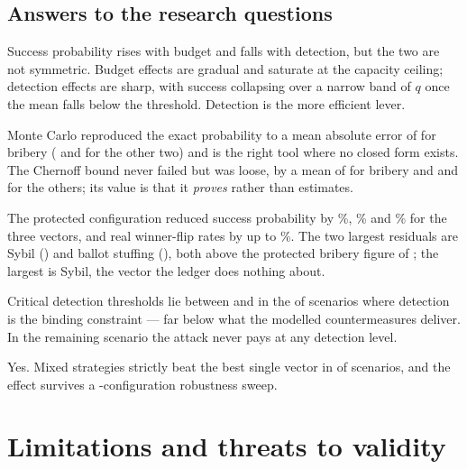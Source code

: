 \documentclass[11pt,a4paper]{article}
\begin{document}
\subsection{Answers to the research questions}

\begin{description}[leftmargin=1.2em,style=nextline,itemsep=4pt]
\item[RQ1] Success probability rises with budget and falls with detection, but the two
  are not symmetric. Budget effects are gradual and saturate at the capacity ceiling;
  detection effects are sharp, with success collapsing over a narrow band of $q$ once
  the mean falls below the threshold. Detection is the more efficient lever.
\item[RQ2] Monte Carlo reproduced the exact probability to a mean absolute error of
  \BriberyMCError{} for bribery (\SybilMCError{} and \BallotStuffingMCError{} for the
  other two) and is the right tool where no closed form exists. The Chernoff bound never
  failed but was loose, by a mean of \BriberyChernoffGap{} for bribery and
  \SybilChernoffGap{} and \BallotStuffingChernoffGap{} for the others; its value is that
  it \emph{proves} rather than estimates.
\item[RQ3] The protected configuration reduced success probability by
  \BriberyRelReduction\%, \SybilRelReduction\% and \BallotStuffingRelReduction\% for the
  three vectors, and real winner-flip rates by up to \FlipBriberyRelReduction\%.
  The two largest residuals are Sybil (\SybilProtected{}) and ballot stuffing
  (\BallotStuffingProtected{}), both above the protected bribery figure of
  \BriberyProtected{}; the largest is Sybil, the vector the ledger does nothing about.
\item[RQ4] Critical detection thresholds lie between \CriticalDetectionMin{} and
  \CriticalDetectionMax{} in the \CriticalDetectionBindingCount{} of
  \CoalitionScenarioCount{} scenarios where detection is the binding constraint --- far
  below what the modelled countermeasures deliver. In the remaining scenario the attack
  never pays at any detection level.
\item[RQ5] Yes. Mixed strategies strictly beat the best single vector in
  \CoalitionBetterCount{} of \CoalitionScenarioCount{} scenarios, and the effect survives
  a \SensitivityConfigs-configuration robustness sweep.
\end{description}

\section{Limitations and threats to validity}
\label{sec:limitations}
\end{document}
